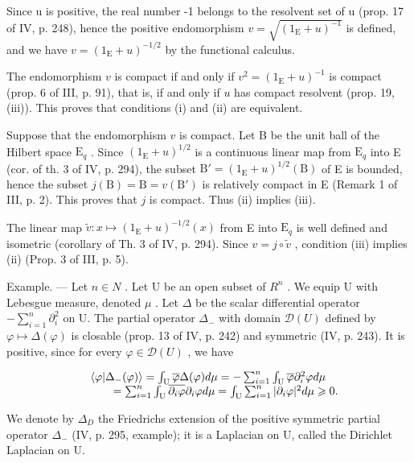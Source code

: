 Since u is positive, the real number -1 belongs to the resolvent set of u (prop. 17 of IV, p. 248), hence the positive endomorphism \(v = \sqrt{(1_{\mathrm{E}} + u)^{-1}}\) is defined, and we have \(v = (1_{\mathrm{E}} + u)^{-1/2}\) by the functional calculus.

The endomorphism \(v\) is compact if and only if \(v^2 = (1_{\mathrm{E}} + u)^{-1}\) is compact (prop. 6 of III, p. 91), that is, if and only if \(u\) has compact resolvent (prop. 19, (iii)). This proves that conditions (i) and (ii) are equivalent.

Suppose that the endomorphism \(v\) is compact. Let B be the unit ball of the Hilbert space \(\mathrm{E}_q\) . Since \((1_{\mathrm{E}} + u)^{1/2}\) is a continuous linear map from \(\mathrm{E}_q\) into E (cor. of th. 3 of IV, p. 294), the subset \(\mathrm{B}' = (1_{\mathrm{E}} + u)^{1/2}(\mathrm{B})\) of E is bounded, hence the subset \(j(\mathrm{B}) = \mathrm{B} = v(\mathrm{B}')\) is relatively compact in E (Remark 1 of III, p. 2). This proves that \(j\) is compact. Thus (ii) implies (iii).

The linear map \(\widetilde{v}\colon x\mapsto(1_{\mathrm{E}}+u)^{-1/2}(x)\) from E into \(\mathrm{E}_{q}\) is well defined and isometric (corollary of Th. 3 of IV, p. 294). Since \(v=j\circ\widetilde{v}\) , condition (iii) implies (ii) (Prop. 3 of III, p. 5).

Example. --- Let \(n \in N\) . Let U be an open subset of \(R^{n}\) . We equip U with Lebesgue measure, denoted \(\mu\) . Let \(\Delta\) be the scalar differential operator \(-\sum_{i=1}^{n}\partial_{i}^{2}\) on U. The partial operator \(\Delta_{-}\) with domain \(\mathcal{D}(U)\) defined by \(\varphi \mapsto \Delta(\varphi)\) is closable (prop. 13 of IV, p. 242) and symmetric (IV, p. 243). It is positive, since for every \(\varphi \in \mathcal{D}(U)\) , we have

\[
\begin{array}{r l} & {\langle \varphi | \Delta_ {-} (\varphi) \rangle = \int_ {\mathrm{U}} \overline {{\varphi}} \Delta (\varphi) d \mu = - \sum_ {i = 1} ^ {n} \int_ {\mathrm{U}} \overline {{\varphi}} \partial_ {i} ^ {2} \varphi d \mu} \\ & {\qquad = \sum_ {i = 1} ^ {n} \int_ {\mathrm{U}} \overline {{\partial_ {i} \varphi}} \partial_ {i} \varphi d \mu = \int_ {\mathrm{U}} \sum_ {i = 1} ^ {n} | \partial_ {i} \varphi | ^ {2} d \mu \geqslant 0.} \end{array}
\]

We denote by \(\Delta_{D}\) the Friedrichs extension of the positive symmetric partial operator \(\Delta_{-}\) (IV, p. 295, example); it is a Laplacian on U, called the Dirichlet Laplacian on U.

